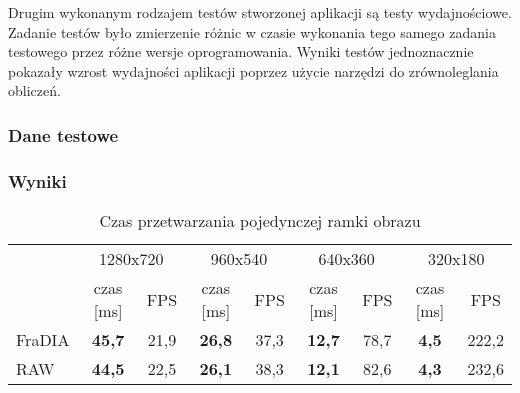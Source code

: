 \documentclass[a4paper,12pt]{article}
\begin{document}
Drugim wykonanym rodzajem testów stworzonej aplikacji są testy wydajnościowe. Zadanie testów było zmierzenie różnic w czasie wykonania tego samego zadania testowego przez różne wersje oprogramowania. Wyniki testów jednoznacznie pokazały wzrost wydajności aplikacji poprzez użycie narzędzi do zrównoleglania obliczeń.

\subsubsection{Dane testowe}
\subsubsection{Wyniki}







\begin{table}[h!]
\caption[Zadanie pierwsze -- czas przetwarzania pojedynczej ramki obrazu]{Czas przetwarzania pojedynczej ramki obrazu}
\centering
\begin{tabular}{lcccccccc}
\toprule
 & \multicolumn{2}{c}{1280x720} & \multicolumn{2}{c}{960x540} & \multicolumn{2}{c}{640x360} & \multicolumn{2}{c}{320x180} \\
\cmidrule(r){2-9}
 & czas [ms] & FPS & czas [ms] & FPS & czas [ms] & FPS & czas [ms] & FPS \\
\midrule
FraDIA & \bf 45,7 & 21,9 & \bf 26,8 & 37,3 & \bf 12,7 & 78,7 & \bf 4,5 & 222,2 \\
RAW    & \bf 44,5 & 22,5 & \bf 26,1 & 38,3 & \bf 12,1 & 82,6 & \bf 4,3 & 232,6 \\
\bottomrule
\end{tabular}
\label{tab:zad_1_wyniki}
\end{table}
\end{document}

